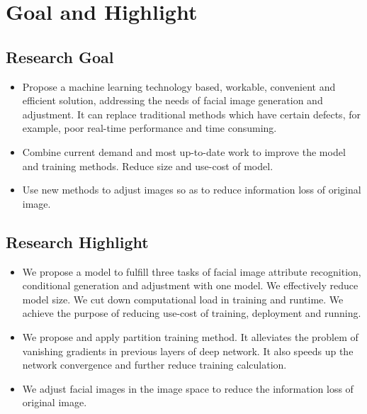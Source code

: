 \section{Goal and Highlight}

\subsection{Research Goal}
\begin{itemize}
\item
Propose a machine learning technology based, workable, convenient and efficient solution,
    addressing the needs of facial image generation and adjustment.
It can replace traditional methods which have certain defects, for example, poor real-time performance and time consuming.
\item
Combine current demand and most up-to-date work to improve the model and training methods.
Reduce size and use-cost of model.
\item
Use new methods to adjust images so as to reduce information loss of original image.
\end{itemize}
\subsection{Research Highlight}
\begin{itemize}
\item
We propose a model to fulfill three tasks of facial image attribute recognition,
    conditional generation and adjustment with one model.
We effectively reduce model size.
We cut down computational load in training and runtime.
We achieve the purpose of reducing use-cost of training, deployment and running.
\item
We propose and apply partition training method.
It alleviates the problem of vanishing gradients in previous layers of deep network.
It also speeds up the network convergence and further reduce training calculation.

\item
We adjust facial images in the image space to reduce the information loss of original image.
\end{itemize}